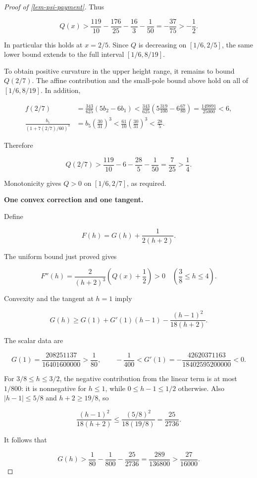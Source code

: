 \documentclass[11pt,a4paper]{article}
\theoremstyle{proofmanuscript}
\begin{document}
\begin{proof}[Proof of \ref{lem-psi-payment}]
Thus

\[
Q(x)>\frac{119}{10}-\frac{176}{25}-\frac{16}{3}-\frac1{50}
=-\frac{37}{75}>-\frac12.
\]

In particular this holds at \(x=2/5\). Since \(Q\) is decreasing on \([1/6,2/5]\), the same lower bound extends to the full interval \([1/6,8/19]\).

To obtain positive curvature in the upper height range, it remains to bound \(Q(2/7)\). The affine contribution and the small-pole bound above hold on all of \([1/6,8/19]\). In addition,

\[
\begin{aligned}
f(2/7)&=\frac{343}{625}(5b_2-6b_1)
<\frac{343}{625}\left(5\frac{319}{100}-6\frac{67}{80}\right)
=\frac{149891}{25000}<6,\\
\frac{b_5}{(1+7(2/7)/60)^3}
&=b_5\left(\frac{30}{31}\right)^3
<\frac{61}{10}\left(\frac{30}{31}\right)^3<\frac{28}{5}.
\end{aligned}
\]

Therefore

\[
Q(2/7)>\frac{119}{10}-6-\frac{28}{5}-\frac1{50}
=\frac7{25}>\frac14.
\]

Monotonicity gives \(Q>0\) on \([1/6,2/7]\), as required.

\textbf{One convex correction and one tangent.}

Define

\[
F(h)=G(h)+\frac1{2(h+2)}.
\]

The uniform bound just proved gives

\[
F''(h)=\frac{2}{(h+2)^3}\left(Q(x)+\frac12\right)>0
\quad\left(\frac38\le h\le4\right).
\]

Convexity and the tangent at \(h=1\) imply

\[
G(h)\ge G(1)+G'(1)(h-1)-\frac{(h-1)^2}{18(h+2)}.
\]

The scalar data are

\[
G(1)=\frac{208251137}{16401600000}>\frac1{80},
\qquad
-\frac1{400}<G'(1)=-\frac{42620371163}{18402595200000}<0.
\]

For \(3/8\le h\le3/2\), the negative contribution from the linear term is at most \(1/800\): it is nonnegative for \(h\le1\), while \(0\le h-1\le1/2\) otherwise. Also \(|h-1|\le5/8\) and \(h+2\ge19/8\), so

\[
\frac{(h-1)^2}{18(h+2)}\le\frac{(5/8)^2}{18(19/8)}=\frac{25}{2736}.
\]

It follows that

\[
G(h)>\frac1{80}-\frac1{800}-\frac{25}{2736}
=\frac{289}{136800}>\frac{27}{16000}.
\]


\end{proof}
\end{document}
